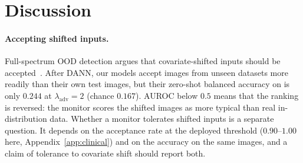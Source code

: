\documentclass{midl}
\newcommand{\lam}{\lambda_{\mathrm{adv}}}
\begin{document}
\section{Discussion}

\paragraph{Accepting shifted inputs.}\label{sec:tolerance}
Full-spectrum OOD detection argues that covariate-shifted inputs should be
accepted~\cite{yang2023}. After DANN, our models accept images from unseen datasets more
readily than their own test images, but their zero-shot balanced accuracy on \texttt{}
is only $0.244$ at $\lam=2$ (chance $0.167$). AUROC below $0.5$ means that the ranking is
reversed: the monitor scores the shifted images as more typical than real in-distribution
data. Whether a monitor tolerates shifted inputs is a separate question. It depends on the
acceptance rate at the deployed threshold ($0.90$--$1.00$ here, Appendix~\ref{app:clinical})
and on the accuracy on the same images, and a claim of tolerance to covariate shift should report both.
\end{document}
